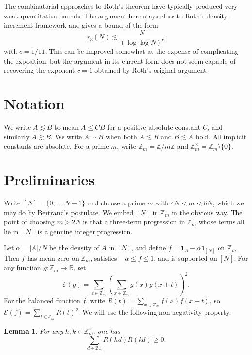 \documentclass[11pt]{amsart}
\newcommand{\Z}{\mathbb{Z}}
\newcommand{\abs}[1]{\lvert#1\rvert}
\newcommand{\one}{\mathbf{1}}
\numberwithin{equation}{section}
\theoremstyle{plain}
\newtheorem{lemma}[theorem]{Lemma}
\theoremstyle{remark}
\begin{document}
The combinatorial approaches to Roth's theorem have typically produced very weak
quantitative bounds. The argument here stays close to Roth's density-increment
framework and gives a bound of the form
$$
        r_3(N)\lesssim \frac{N}{(\log\log N)^c}
$$
with $c=1/11$. This can be improved somewhat at the expense of complicating the exposition, but the argument in its current form does not seem capable of recovering the exponent $c=1$ obtained by Roth's original argument.

\section{Notation}

We write $A\lesssim B$ to mean $A\leq CB$ for a positive absolute constant
$C$, and similarly $A\gtrsim B$. We write $A\sim B$ when both $A\lesssim B$
and $B\lesssim A$ hold. All implicit constants are absolute. For a prime
$m$, write $\Z_m=\Z/m\Z$ and $\Z_m^\times=\Z_m\setminus\{0\}$.

\section{Preliminaries}

Write $[N]=\{0,\ldots,N-1\}$ and choose a prime $m$ with $4N<m<8N$, which we
may do by Bertrand's postulate. We embed $[N]$ in $\Z_m$ in the obvious way.
The point of choosing $m>2N$ is that a three-term progression in $\Z_m$ whose
terms all lie in $[N]$ is a genuine integer progression.

Let $\alpha=\abs{A}/N$ be the density of $A$ in $[N]$, and define
$f=\one_A-\alpha\one_{[N]}$ on $\Z_m$. Then $f$ has mean zero on $\Z_m$,
satisfies $-\alpha\leq f\leq 1$, and is supported on $[N]$. For any function
$g\colon\Z_m\to\mathbb R$, set
$$
\mathcal E(g)=\sum_{t\in\Z_m}\left(\sum_{x\in\Z_m}g(x)g(x+t)\right)^2.
$$
For the balanced function $f$, write $R(t)=\sum_{x\in\Z_m}f(x)f(x+t)$, so
$\mathcal E(f)=\sum_{t\in\Z_m}R(t)^2$. We will use the following
non-negativity property.

\begin{lemma}\label{lem:pos}
For any $h,k\in\Z_m^\times$, one has
\begin{equation}\label{eq:positivity}
\sum_{d\in\Z_m}R(hd)R(kd)\geq 0.
\end{equation}
\end{lemma}
\end{document}
